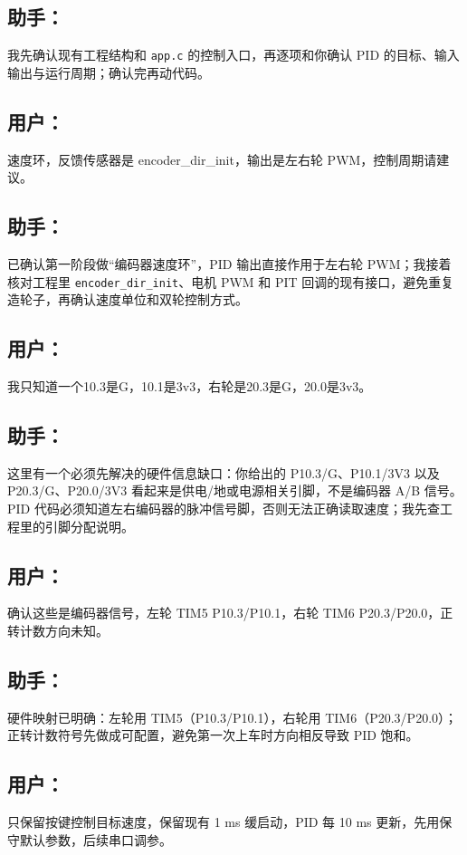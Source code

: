 \documentclass[11pt,a4paper,fontset=fandol]{ctexart}
\begin{document}
\subsection*{助手：}
我先确认现有工程结构和 \texttt{app.c} 的控制入口，再逐项和你确认 PID 的目标、输入输出与运行周期；确认完再动代码。

\subsection*{用户：}
速度环，反馈传感器是 encoder\_dir\_init，输出是左右轮 PWM，控制周期请建议。

\subsection*{助手：}
已确认第一阶段做“编码器速度环”，PID 输出直接作用于左右轮 PWM；我接着核对工程里 \texttt{encoder\_dir\_init}、电机 PWM 和 PIT 回调的现有接口，避免重复造轮子，再确认速度单位和双轮控制方式。

\subsection*{用户：}
我只知道一个10.3是G，10.1是3v3，右轮是20.3是G，20.0是3v3。

\subsection*{助手：}
这里有一个必须先解决的硬件信息缺口：你给出的 P10.3/G、P10.1/3V3 以及 P20.3/G、P20.0/3V3 看起来是供电/地或电源相关引脚，不是编码器 A/B 信号。PID 代码必须知道左右编码器的脉冲信号脚，否则无法正确读取速度；我先查工程里的引脚分配说明。

\subsection*{用户：}
确认这些是编码器信号，左轮 TIM5 P10.3/P10.1，右轮 TIM6 P20.3/P20.0，正转计数方向未知。

\subsection*{助手：}
硬件映射已明确：左轮用 TIM5（P10.3/P10.1），右轮用 TIM6（P20.3/P20.0）；正转计数符号先做成可配置，避免第一次上车时方向相反导致 PID 饱和。

\subsection*{用户：}
只保留按键控制目标速度，保留现有 1 ms 缓启动，PID 每 10 ms 更新，先用保守默认参数，后续串口调参。
\end{document}
